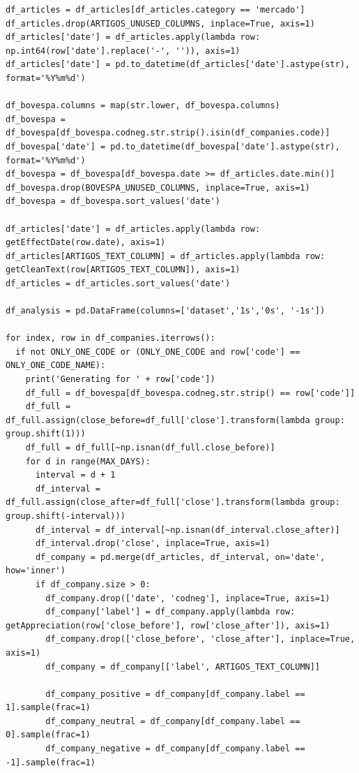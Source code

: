 \documentclass[grad,numbers]{coppe}
\begin{document}
\begin{verbatim}
df_articles = df_articles[df_articles.category == 'mercado']
df_articles.drop(ARTIGOS_UNUSED_COLUMNS, inplace=True, axis=1)
df_articles['date'] = df_articles.apply(lambda row: np.int64(row['date'].replace('-', '')), axis=1)
df_articles['date'] = pd.to_datetime(df_articles['date'].astype(str), format='%Y%m%d')

df_bovespa.columns = map(str.lower, df_bovespa.columns)
df_bovespa = df_bovespa[df_bovespa.codneg.str.strip().isin(df_companies.code)]
df_bovespa['date'] = pd.to_datetime(df_bovespa['date'].astype(str), format='%Y%m%d')
df_bovespa = df_bovespa[df_bovespa.date >= df_articles.date.min()]
df_bovespa.drop(BOVESPA_UNUSED_COLUMNS, inplace=True, axis=1)
df_bovespa = df_bovespa.sort_values('date')

df_articles['date'] = df_articles.apply(lambda row: getEffectDate(row.date), axis=1)
df_articles[ARTIGOS_TEXT_COLUMN] = df_articles.apply(lambda row: getCleanText(row[ARTIGOS_TEXT_COLUMN]), axis=1)
df_articles = df_articles.sort_values('date')

df_analysis = pd.DataFrame(columns=['dataset','1s','0s', '-1s'])

for index, row in df_companies.iterrows():
  if not ONLY_ONE_CODE or (ONLY_ONE_CODE and row['code'] == ONLY_ONE_CODE_NAME):
    print('Generating for ' + row['code'])
    df_full = df_bovespa[df_bovespa.codneg.str.strip() == row['code']]
    df_full = df_full.assign(close_before=df_full['close'].transform(lambda group: group.shift(1)))
    df_full = df_full[~np.isnan(df_full.close_before)]
    for d in range(MAX_DAYS):
      interval = d + 1
      df_interval = df_full.assign(close_after=df_full['close'].transform(lambda group: group.shift(-interval)))
      df_interval = df_interval[~np.isnan(df_interval.close_after)]
      df_interval.drop('close', inplace=True, axis=1)
      df_company = pd.merge(df_articles, df_interval, on='date', how='inner')
      if df_company.size > 0:
        df_company.drop(['date', 'codneg'], inplace=True, axis=1)
        df_company['label'] = df_company.apply(lambda row: getAppreciation(row['close_before'], row['close_after']), axis=1)
        df_company.drop(['close_before', 'close_after'], inplace=True, axis=1)
        df_company = df_company[['label', ARTIGOS_TEXT_COLUMN]]
        
        df_company_positive = df_company[df_company.label == 1].sample(frac=1)
        df_company_neutral = df_company[df_company.label == 0].sample(frac=1)
        df_company_negative = df_company[df_company.label == -1].sample(frac=1)


\end{verbatim}
\end{document}
